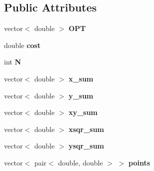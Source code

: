 \subsection*{Public Attributes}
\begin{DoxyCompactItemize}
\item 
\mbox{\label{classSegmentedLeastSquares_a12df4dd57a14e03f0b8a71b32e29d846}} 
vector$<$ double $>$ {\bfseries O\+PT}
\item 
\mbox{\label{classSegmentedLeastSquares_aec34a13c1d6aa54e7d1ef685d827c152}} 
double {\bfseries cost}
\item 
\mbox{\label{classSegmentedLeastSquares_a677b17c1f13a1de71e008cd68c5ee472}} 
int {\bfseries N}
\item 
\mbox{\label{classSegmentedLeastSquares_afbe30a8787c849ebc12245cfda0bdb07}} 
vector$<$ double $>$ {\bfseries x\+\_\+sum}
\item 
\mbox{\label{classSegmentedLeastSquares_ada881350ce26b8d16b510666431a7fdb}} 
vector$<$ double $>$ {\bfseries y\+\_\+sum}
\item 
\mbox{\label{classSegmentedLeastSquares_a4f085e281d0f9fa4bb546c346ad18861}} 
vector$<$ double $>$ {\bfseries xy\+\_\+sum}
\item 
\mbox{\label{classSegmentedLeastSquares_a50306feeaa67c0d16314f315a2e7f60b}} 
vector$<$ double $>$ {\bfseries xsqr\+\_\+sum}
\item 
\mbox{\label{classSegmentedLeastSquares_a28c8d41eb4f6945026299f9508c23be4}} 
vector$<$ double $>$ {\bfseries ysqr\+\_\+sum}
\item 
\mbox{\label{classSegmentedLeastSquares_a826bbb30d16ca69c332561bd666088fd}} 
vector$<$ pair$<$ double, double $>$ $>$ {\bfseries points}
\item 
\mbox{\label{classSegmentedLeastSquares_aee47b1e1728f0d0e1adf21d46f40ca69}} 

\end{DoxyCompactItemize}
